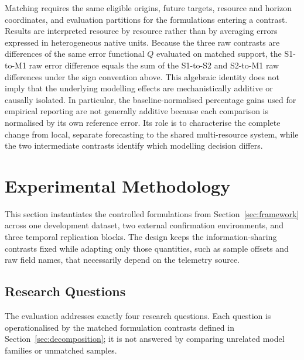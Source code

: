 \documentclass[a4paper,fleqn]{cas-dc}
\begin{document}
Matching requires the same eligible origins, future targets, resource and
horizon coordinates, and evaluation partitions for the formulations entering
a contrast. Results are interpreted resource by resource rather than by
averaging errors expressed in heterogeneous native units. Because the three raw
contrasts are differences of the same error functional $Q$ evaluated on matched
support, the S1-to-M1 raw error difference equals the sum of the S1-to-S2 and
S2-to-M1 raw differences under the sign convention above. This algebraic
identity does not imply that the underlying modelling effects are
mechanistically additive or causally isolated. In particular, the
baseline-normalised percentage gains used for empirical reporting are not
generally additive because each comparison is normalised by its own reference
error. Its role is
to characterise the complete change from local, separate forecasting to the
shared multi-resource system, while the two intermediate contrasts identify
which modelling decision differs.

\section{Experimental Methodology}
\label{sec:methodology}

This section instantiates the controlled formulations from
Section~\ref{sec:framework} across one development dataset, two external
confirmation environments, and three temporal replication blocks.  The design
keeps the information-sharing contrasts fixed while adapting only those
quantities, such as sample offsets and raw field names, that necessarily depend
on the telemetry source.

\subsection{Research Questions}
\label{sec:research-questions}

The evaluation addresses exactly four research questions.  Each question is
operationalised by the matched formulation contrasts defined in
Section~\ref{sec:decomposition}; it is not answered by comparing unrelated
model families or unmatched samples.
\end{document}
